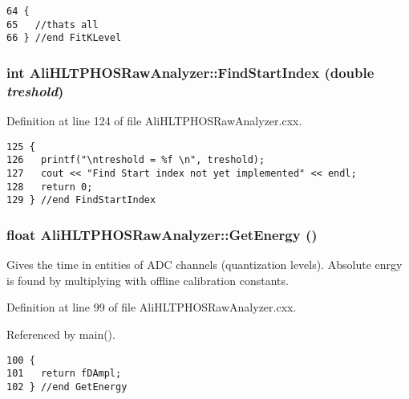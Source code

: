 \footnotesize\begin{verbatim}64 {
65   //thats all 
66 } //end FitKLevel
\end{verbatim}\normalsize 


\subsubsection{\setlength{\rightskip}{0pt plus 5cm}int Ali\-HLTPHOSRaw\-Analyzer::Find\-Start\-Index (double {\em treshold})\hspace{0.3cm}{\tt  [inherited]}}\label{classAliHLTPHOSRawAnalyzer_AliHLTPHOSRawAnalyzerPeakFindera9}




Definition at line 124 of file Ali\-HLTPHOSRaw\-Analyzer.cxx.

\footnotesize\begin{verbatim}125 {
126   printf("\ntreshold = %f \n", treshold);
127   cout << "Find Start index not yet implemented" << endl;
128   return 0;
129 } //end FindStartIndex
\end{verbatim}\normalsize 


\subsubsection{\setlength{\rightskip}{0pt plus 5cm}float Ali\-HLTPHOSRaw\-Analyzer::Get\-Energy ()\hspace{0.3cm}{\tt  [inherited]}}\label{classAliHLTPHOSRawAnalyzer_AliHLTPHOSRawAnalyzerPeakFindera11}


Gives the time in entities of ADC channels (quantization levels). Absolute enrgy is found by multiplying with offline calibration constants. 

Definition at line 99 of file Ali\-HLTPHOSRaw\-Analyzer.cxx.

Referenced by main().

\footnotesize\begin{verbatim}100 {
101   return fDAmpl;
102 } //end GetEnergy
\end{verbatim}\normalsize 



